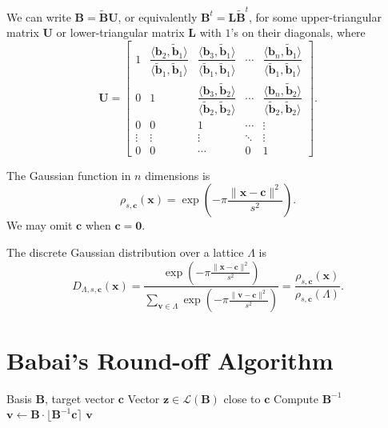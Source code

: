 We can write $\mathbf{B} = \mathbf{\tilde B U}$, or equivalently $\mathbf{B}^t = \mathbf{L \tilde B}^t$, for some upper-triangular matrix $\mathbf{U}$ or lower-triangular matrix $\mathbf{L}$ with $1$'s on their diagonals, where
\[
	\mathbf{U} =
	\begin{bmatrix}
		1 & \dfrac{\langle \mathbf{b}_2, \mathbf{\tilde b}_1 \rangle}{\langle \mathbf{\tilde b}_1, \mathbf{\tilde b}_1 \rangle} & \dfrac{\langle \mathbf{b}_3, \mathbf{\tilde b}_1 \rangle}{\langle \mathbf{\tilde b}_1, \mathbf{\tilde b}_1 \rangle} & \cdots & \dfrac{\langle \mathbf{b}_n, \mathbf{\tilde b}_1 \rangle}{\langle \mathbf{\tilde b}_1, \mathbf{\tilde b}_1 \rangle} \\
		0 & 1 & \dfrac{\langle \mathbf{b}_3, \mathbf{\tilde b}_2 \rangle}{\langle \mathbf{\tilde b}_2, \mathbf{\tilde b}_2 \rangle} & \cdots & \dfrac{\langle \mathbf{b}_n, \mathbf{\tilde b}_2 \rangle}{\langle \mathbf{\tilde b}_2, \mathbf{\tilde b}_2 \rangle} \\
		0 & 0 & 1 & \cdots & \vdots \\
		\vdots & \vdots & \vdots & \ddots & \vdots \\
		0 & 0 & \cdots & 0 & 1
	\end{bmatrix}.
\]

\begin{definition}
	The Gaussian function in $n$ dimensions is
	\[
		\rho_{s,\mathbf{c}}(\mathbf{x}) = \exp\left( -\pi \frac{\|\mathbf{x} - \mathbf{c}\|^2}{s^2} \right).
	\]
	We may omit $\mathbf{c}$ when $\mathbf{c} = \mathbf{0}$.
\end{definition}

\begin{definition}
	The discrete Gaussian distribution over a lattice $\Lambda$ is
	\[
		D_{\Lambda,s,\mathbf{c}}(\mathbf{x}) = \frac{\exp\left( -\pi \frac{\|\mathbf{x}-\mathbf{c}\|^2}{s^2} \right)}{\sum_{\mathbf{v} \in \Lambda} \exp\left( -\pi \frac{\|\mathbf{v}-\mathbf{c}\|^2}{s^2} \right)} = \frac{\rho_{s,\mathbf{c}}(\mathbf{x})}{\rho_{s,\mathbf{c}}(\Lambda)}.
	\]
\end{definition}

\section{Babai's Round-off Algorithm~\cite{Bab85}}

\begin{algorithm}[H]
	\caption{Babai's Round-off Algorithm}
	\label{alg:babai}
	\begin{algorithmic}[1]
		\Require Basis $\mathbf{B}$, target vector $\mathbf{c}$
		\Ensure Vector $\mathbf{z} \in \mathcal{L}(\mathbf{B})$ close to $\mathbf{c}$
		\State Compute $\mathbf{B}^{-1}$
		\State $\mathbf{v} \gets \mathbf{B} \cdot \lfloor \mathbf{B}^{-1}\mathbf{c} \rceil$
		\State \Return $\mathbf{v}$
	\end{algorithmic}
\end{algorithm}

